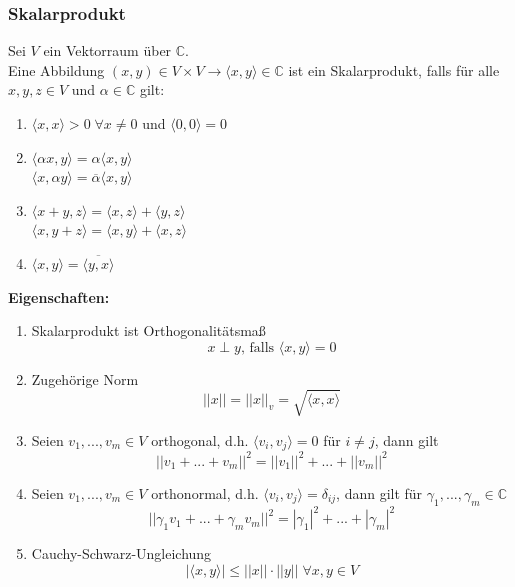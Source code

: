 \documentclass[a4paper,twocolumn,10pt]{article}
\begin{document}
\subsubsection{Skalarprodukt}
Sei $V$ ein Vektorraum über $\mathbb{C}$.\\
Eine Abbildung $(x,y)\in V\times V\rightarrow\langle x,y\rangle \in\mathbb{C}$ ist ein Skalarprodukt, falls für alle $x,y,z\in V$ und $\alpha\in\mathbb{C}$ gilt:
\begin{enumerate}
\item $\langle x,x\rangle >0\;\forall x\neq 0$ und $\langle 0,0\rangle=0$
\item $\langle\alpha x,y\rangle =\alpha\langle x,y\rangle$\\
$\langle x,\alpha y\rangle =\overline{\alpha}\langle x,y\rangle$
\item $\langle x+y,z\rangle =\langle x,z\rangle+\langle y,z\rangle$\\
$\langle x,y+z\rangle =\langle x,y\rangle +\langle x,z\rangle$
\item $\langle x,y\rangle=\overline{\langle y,x\rangle}$
\end{enumerate}
\textbf{Eigenschaften:}\\
\begin{enumerate}
\item Skalarprodukt ist Orthogonalitätsmaß
\begin{equation*}
x\perp y\text{, falls }\langle x,y\rangle=0
\end{equation*}
\item Zugehörige Norm
\begin{equation*}
||x||=||x||_v=\sqrt{\langle x,x\rangle}
\end{equation*}
\item Seien $v_1,...,v_m\in V$ orthogonal, d.h. $\langle v_i,v_j\rangle=0$ für $i\neq j$, dann gilt
\begin{equation*}
||v_1+...+v_m||^2=||v_1||^2+...+||v_m||^2
\end{equation*}
\item Seien $v_1,...,v_m\in V$ orthonormal, d.h. $\langle v_i,v_j\rangle=\delta_{ij}$, dann gilt für $\gamma_1,...,\gamma_m\in\mathbb{C}$
\begin{equation*}
||\gamma_1 v_1+...+\gamma_m v_m||^2=|\gamma_1|^2+...+|\gamma_m|^2
\end{equation*}
\item Cauchy-Schwarz-Ungleichung
\begin{equation*}
|\langle x,y\rangle|\leq||x||\cdot||y||\;\forall x,y\in V
\end{equation*}
\end{enumerate}
\end{document}
